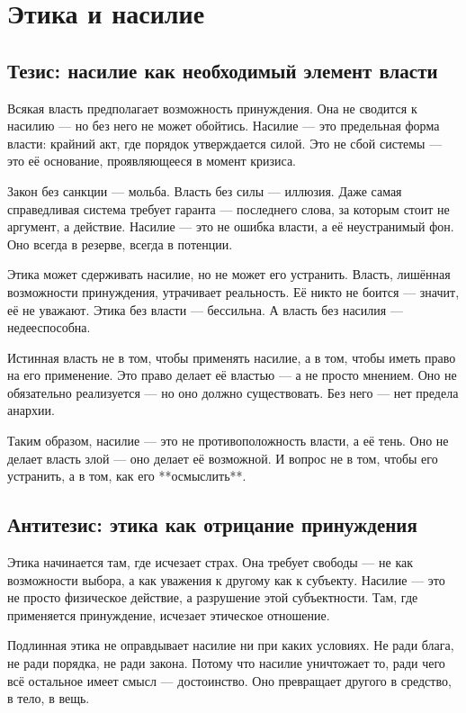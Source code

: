 \chapter{Этика и насилие}

\section{Тезис: насилие как необходимый элемент власти}

Всякая власть предполагает возможность принуждения. Она не сводится к насилию — но без него не может обойтись. Насилие — это предельная форма власти: крайний акт, где порядок утверждается силой. Это не сбой системы — это её основание, проявляющееся в момент кризиса.

Закон без санкции — мольба. Власть без силы — иллюзия. Даже самая справедливая система требует гаранта — последнего слова, за которым стоит не аргумент, а действие. Насилие — это не ошибка власти, а её неустранимый фон. Оно всегда в резерве, всегда в потенции.

Этика может сдерживать насилие, но не может его устранить. Власть, лишённая возможности принуждения, утрачивает реальность. Её никто не боится — значит, её не уважают. Этика без власти — бессильна. А власть без насилия — недееспособна.

Истинная власть не в том, чтобы применять насилие, а в том, чтобы иметь право на его применение. Это право делает её властью — а не просто мнением. Оно не обязательно реализуется — но оно должно существовать. Без него — нет предела анархии.

Таким образом, насилие — это не противоположность власти, а её тень. Оно не делает власть злой — оно делает её возможной. И вопрос не в том, чтобы его устранить, а в том, как его **осмыслить**.

\section{Антитезис: этика как отрицание принуждения}

Этика начинается там, где исчезает страх. Она требует свободы — не как возможности выбора, а как уважения к другому как к субъекту. Насилие — это не просто физическое действие, а разрушение этой субъектности. Там, где применяется принуждение, исчезает этическое отношение.

Подлинная этика не оправдывает насилие ни при каких условиях. Не ради блага, не ради порядка, не ради закона. Потому что насилие уничтожает то, ради чего всё остальное имеет смысл — достоинство. Оно превращает другого в средство, в тело, в вещь.

